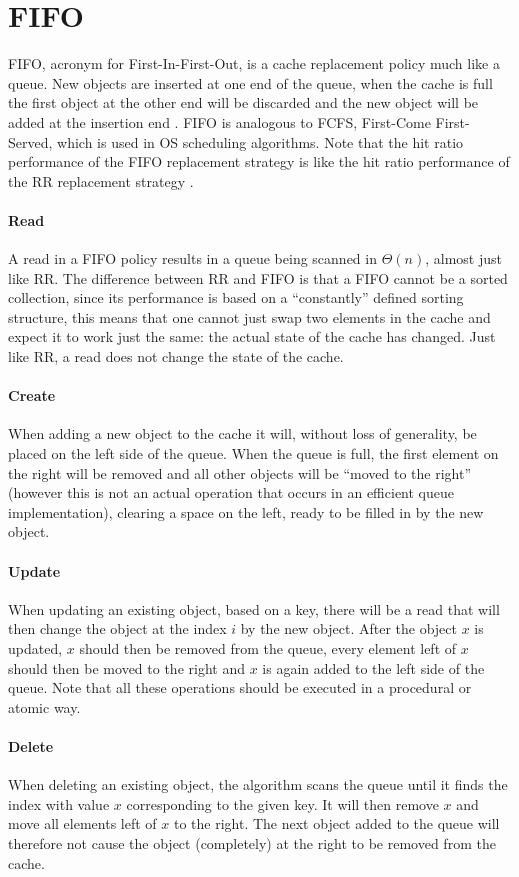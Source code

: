 \documentclass[pdftex,a4paper,12pt,twoside]{report}
\begin{document}
\section{FIFO}
FIFO, acronym for First-In-First-Out, is a cache replacement policy much like a queue. New objects are inserted at one end of the queue, when the cache is full the first object at the other end will be discarded and the new object will be added at the insertion end \citep{reineke2007timing}. FIFO is analogous to FCFS, First-Come First-Served, which is used in OS scheduling algorithms.
Note that the hit ratio performance of the FIFO replacement strategy is like the hit ratio performance of the RR replacement strategy \citep{rao1978performance}.
\paragraph{Read} A read in a FIFO policy results in a queue being scanned in $\Theta(n)$, almost just like RR. The difference between RR and FIFO is that a FIFO cannot be a sorted collection, since its performance is based on a ``constantly'' defined sorting structure, this means that one cannot just swap two elements in the cache and expect it to work just the same: the actual state of the cache has changed. Just like RR, a read does not change the state of the cache.
\paragraph{Create} When adding a new object to the cache it will, without loss of generality, be placed on the left side of the queue. When the queue is full, the first element on the right will be removed and all other objects will be ``moved to the right'' (however this is not an actual operation that occurs in an efficient queue implementation), clearing a space on the left, ready to be filled in by the new object.
\paragraph{Update} When updating an existing object, based on a key, there will be a read that will then change the object at the index $i$ by the new object. After the object $x$ is updated, $x$ should then be removed from the queue, every element left of $x$ should then be moved to the right and $x$ is again added to the left side of the queue. Note that all these operations should be executed in a procedural or atomic way.
\paragraph{Delete} When deleting an existing object, the algorithm scans the queue until it finds the index with value $x$ corresponding to the given key. It will then remove $x$ and move all elements left of $x$ to the right. The next object added to the queue will therefore not cause the object (completely) at the right to be removed from the cache.
\end{document}
